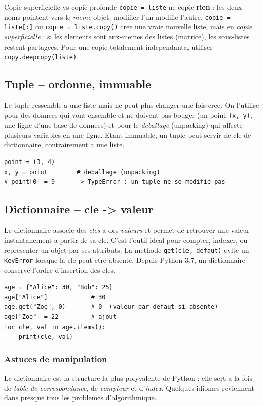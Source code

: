 \documentclass[11pt,a4paper]{article}
\begin{document}
\begin{infobox}{Copie superficielle vs copie profonde}
\texttt{copie = liste} ne copie \textbf{rien} : les deux noms pointent vers le
\emph{meme} objet, modifier l'un modifie l'autre. \texttt{copie =
liste[:]} ou \texttt{copie = liste.copy()} cree une vraie nouvelle liste, mais
en \emph{copie superficielle} : si les elements sont eux-memes des listes
(matrice), les sous-listes restent partagees. Pour une copie totalement
independante, utiliser \texttt{copy.deepcopy(liste)}.
\end{infobox}

\subsection{Tuple -- ordonne, immuable}
Le tuple ressemble a une liste mais ne peut plus changer une fois cree. On
l'utilise pour des donnees qui vont ensemble et ne doivent pas bouger (un point
\texttt{(x, y)}, une ligne d'une base de donnees) et pour le \emph{deballage}
(unpacking) qui affecte plusieurs variables en une ligne. Etant immuable, un
tuple peut servir de cle de dictionnaire, contrairement a une liste.

\begin{lstlisting}
point = (3, 4)
x, y = point        # deballage (unpacking)
# point[0] = 9      -> TypeError : un tuple ne se modifie pas
\end{lstlisting}

\subsection{Dictionnaire -- cle -> valeur}
Le dictionnaire associe des \emph{cles} a des \emph{valeurs} et permet de
retrouver une valeur instantanement a partir de sa cle. C'est l'outil ideal pour
compter, indexer, ou representer un objet par ses attributs. La methode
\texttt{get(cle, defaut)} evite un \texttt{KeyError} lorsque la cle peut etre
absente. Depuis Python 3.7, un dictionnaire conserve l'ordre d'insertion des
cles.

\begin{lstlisting}
age = {"Alice": 30, "Bob": 25}
age["Alice"]            # 30
age.get("Zoe", 0)       # 0  (valeur par defaut si absente)
age["Zoe"] = 22         # ajout
for cle, val in age.items():
    print(cle, val)
\end{lstlisting}

\subsubsection*{Astuces de manipulation}
Le dictionnaire est la structure la plus polyvalente de Python : elle sert a la
fois de \emph{table de correspondance}, de \emph{compteur} et d'\emph{index}.
Quelques idiomes reviennent dans presque tous les problemes d'algorithmique.
\end{document}
